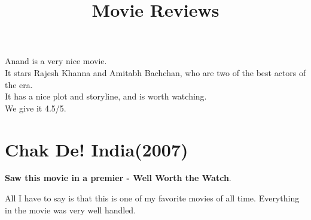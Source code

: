 \documentclass[11pt]{article}
\title{\textbf{Movie Reviews}}
\author{}
\date{}
\begin{document}
\maketitle
{}
Anand is a very nice movie.\\
It stars Rajesh Khanna and Amitabh Bachchan, who are two of the best actors of the era.\\
It has a nice plot and storyline, and is worth watching.\\
We give it 4.5/5.

\section*{Chak De! India(2007)}
\textbf{Saw this movie in a premier - Well Worth the Watch}.

All I have to say is that this is one of my favorite movies of all time. Everything in the movie was very well handled.
\end{document}
